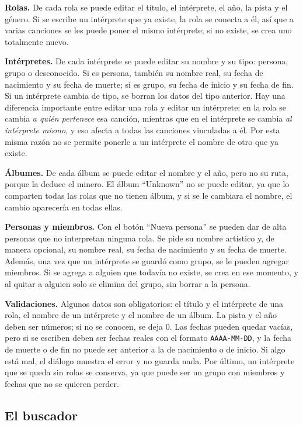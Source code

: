 \documentclass[12pt,letterpaper]{article}
\begin{document}
\textbf{Rolas.} De cada rola se puede editar el título, el intérprete, el
año, la pista y el género. Si se escribe un intérprete que ya existe, la
rola se conecta a él, así que a varias canciones se les puede poner el
mismo intérprete; si no existe, se crea uno totalmente nuevo.

\textbf{Intérpretes.} De cada intérprete se puede editar su nombre y su
tipo: persona, grupo o desconocido. Si es persona, también su nombre real,
su fecha de nacimiento y su fecha de muerte; si es grupo, su fecha de
inicio y su fecha de fin. Si un intérprete cambia de tipo, se borran los
datos del tipo anterior. Hay una diferencia importante entre editar una
rola y editar un intérprete: en la rola se cambia \emph{a quién pertenece}
esa canción, mientras que en el intérprete se cambia \emph{al intérprete
mismo}, y eso afecta a todas las canciones vinculadas a él. Por esta misma
razón no se permite ponerle a un intérprete el nombre de otro que ya
existe.

\textbf{Álbumes.} De cada álbum se puede editar el nombre y el año, pero
no su ruta, porque la deduce el minero. El álbum ``Unknown'' no se puede
editar, ya que lo comparten todas las rolas que no tienen álbum, y si se
le cambiara el nombre, el cambio aparecería en todas ellas.

\textbf{Personas y miembros.} Con el botón ``Nueva persona'' se pueden dar
de alta personas que no interpretan ninguna rola. Se pide su nombre
artístico y, de manera opcional, su nombre real, su fecha de nacimiento y
su fecha de muerte. Además, una vez que un intérprete se guardó como
grupo, se le pueden agregar miembros. Si se agrega a alguien que todavía
no existe, se crea en ese momento, y al quitar a alguien solo se elimina
del grupo, sin borrar a la persona.

\textbf{Validaciones.} Algunos datos son obligatorios: el título y el
intérprete de una rola, el nombre de un intérprete y el nombre de un
álbum. La pista y el año deben ser números; si no se conocen, se deja 0.
Las fechas pueden quedar vacías, pero si se escriben deben ser fechas
reales con el formato \texttt{AAAA-MM-DD}, y la fecha de muerte o de fin
no puede ser anterior a la de nacimiento o de inicio. Si algo está mal,
el diálogo muestra el error y no guarda nada. Por último, un intérprete
que se queda sin rolas se conserva, ya que puede ser un grupo con miembros
y fechas que no se quieren perder.

\subsection{El buscador}
\end{document}
